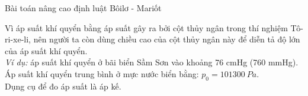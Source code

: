 \begin{dang}{Bài toán nâng cao định luật Bôilơ - Mariốt}
{				%
			\begin{note}
				Vì áp suất khí quyển bằng áp suất gây ra bởi cột thủy ngân trong thí nghiệm Tô-ri-xe-li, nên người ta còn dùng chiều cao của cột thủy ngân này để diễn tả độ lớn của áp suất khí quyển.\\
				\textit{Ví dụ:} áp suất khí quyển ở bãi biển Sầm Sơn vào khoảng 76 cmHg (760 mmHg).\\
				Áp suất khí quyển trung bình ở mực nước biển bằng: $p_0=101300\ Pa$.\\	
				Dụng cụ để đo áp suất là áp kế.
		\end{note}	}
		
	\end{dang}